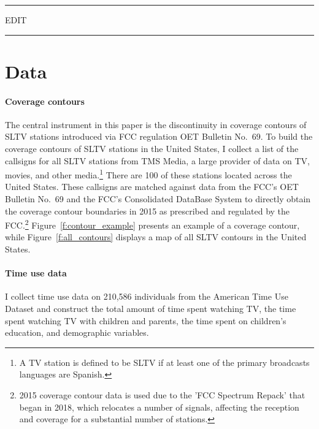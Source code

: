 \documentclass[11pt]{article}
\begin{document}
\vspace{5em}
\hrule
\vspace{.5em}
EDIT \\
\hrule
\vspace{.5em}

\section{Data}\label{s:data}



\paragraph{Coverage contours}  The central instrument in this paper is the discontinuity in coverage contours of SLTV stations introduced via FCC regulation OET Bulletin No.~69. To build the coverage contours of SLTV stations in the United States, I collect a list of the callsigns for all SLTV stations from TMS Media, a large provider of data on TV, movies, and other media.\footnote{ A TV station is defined to be SLTV if at least one of the primary broadcasts languages are Spanish.} There are 100 of these stations located across the United States. These callsigns are matched against data from the FCC's OET Bulletin No.~69 and the FCC's Consolidated DataBase System to directly obtain the coverage contour boundaries in 2015 as prescribed and regulated by the FCC.\footnote{ 2015 coverage contour data is used due to the 'FCC Spectrum Repack' that began in 2018, which relocates a number of signals, affecting the reception and coverage for a substantial number of stations.}  %
Figure~\ref{f:contour_example} presents an example of a coverage contour, while Figure~\ref{f:all_contours} displays a map of all SLTV contours in the United States.

\paragraph{Time use data} I collect time use data on 210,586 individuals from the American Time Use Dataset and construct the total amount of time spent watching TV, the time spent watching TV with children and parents, the time spent on children's education, and demographic variables.   
\end{document}
